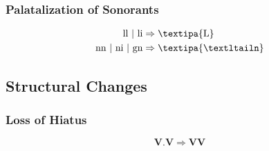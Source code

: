 \documentclass{report}[12pt]
\begin{document}
\subsubsection{Palatalization of Sonorants}

\begin{tcolorbox}
  \begin{align*}  
    \text{ll}\ |\ \text{li} & \Rightarrow \text{\textipa{L}} \\
    \text{nn}\ |\ \text{ni}\ |\ \text{gn} & \Rightarrow \text{\textipa{\textltailn}}
  \end{align*}
\end{tcolorbox}

\subsection{Structural Changes}

\subsubsection{Loss of Hiatus}

\begin{tcolorbox}
  \[ \textbf{V}.\textbf{V} \Rightarrow \textbf{VV} \]
\end{tcolorbox}
\end{document}
